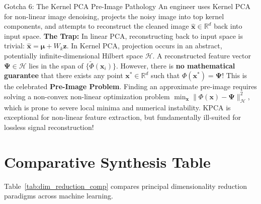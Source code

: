 \begin{trapbox}{Gotcha 6: The Kernel PCA Pre-Image Pathology}
An engineer uses Kernel PCA for non-linear image denoising, projects the noisy image into top kernel components, and attempts to reconstruct the cleaned image $\hat{\mathbf{x}} \in \mathbb{R}^d$ back into input space.
\textbf{The Trap:} In linear PCA, reconstructing back to input space is trivial: $\hat{\mathbf{x}} = \boldsymbol{\mu} + W_k \mathbf{z}$. In Kernel PCA, projection occurs in an abstract, potentially infinite-dimensional Hilbert space $\mathcal{H}$. A reconstructed feature vector $\boldsymbol{\Psi} \in \mathcal{H}$ lies in the span of $\{\tilde{\Phi}(\mathbf{x}_i)\}$. However, there is \textbf{no mathematical guarantee} that there exists any point $\mathbf{x}^* \in \mathbb{R}^d$ such that $\Phi(\mathbf{x}^*) = \boldsymbol{\Psi}$! This is the celebrated \textbf{Pre-Image Problem}. Finding an approximate pre-image requires solving a non-convex non-linear optimization problem $\min_{\mathbf{x}} \|\Phi(\mathbf{x}) - \boldsymbol{\Psi}\|_{\mathcal{H}}^2$, which is prone to severe local minima and numerical instability. KPCA is exceptional for non-linear feature extraction, but fundamentally ill-suited for lossless signal reconstruction!
\end{trapbox}

\section{Comparative Synthesis Table}

Table~\ref{tab:dim_reduction_comp} compares principal dimensionality reduction paradigms across machine learning.

